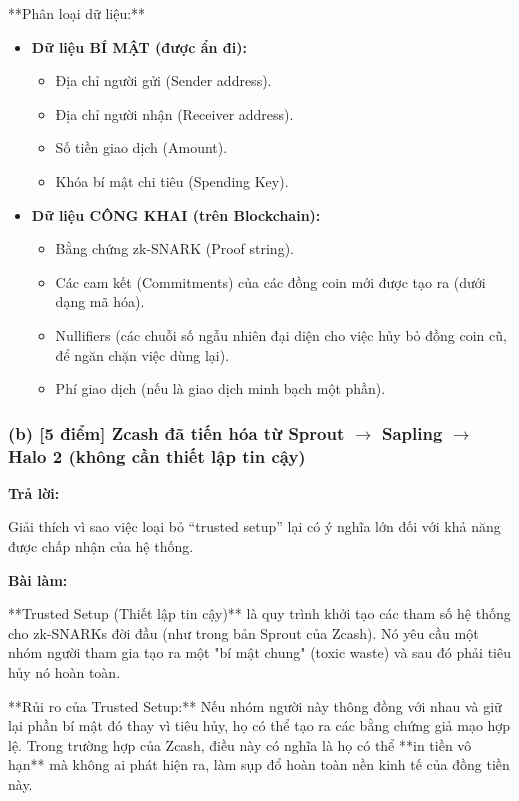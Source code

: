 **Phân loại dữ liệu:**
\begin{itemize}
    \item \textbf{Dữ liệu BÍ MẬT (được ẩn đi):}
        \begin{itemize}
            \item Địa chỉ người gửi (Sender address).
            \item Địa chỉ người nhận (Receiver address).
            \item Số tiền giao dịch (Amount).
            \item Khóa bí mật chi tiêu (Spending Key).
        \end{itemize}
    \item \textbf{Dữ liệu CÔNG KHAI (trên Blockchain):}
        \begin{itemize}
            \item Bằng chứng zk-SNARK (Proof string).
            \item Các cam kết (Commitments) của các đồng coin mới được tạo ra (dưới dạng mã hóa).
            \item Nullifiers (các chuỗi số ngẫu nhiên đại diện cho việc hủy bỏ đồng coin cũ, để ngăn chặn việc dùng lại).
            \item Phí giao dịch (nếu là giao dịch minh bạch một phần).
        \end{itemize}
\end{itemize}

\subsubsection{(b) [5 điểm] Zcash đã tiến hóa từ Sprout \texorpdfstring{$\rightarrow$}{->} Sapling \texorpdfstring{$\rightarrow$}{->} Halo 2 (không cần thiết lập tin cậy)}

\begin{center}
    \textbf{Trả lời:}
\end{center}

Giải thích vì sao việc loại bỏ ``trusted setup'' lại có ý nghĩa lớn đối với khả năng được chấp nhận của hệ thống.

\textbf{Bài làm:}

**Trusted Setup (Thiết lập tin cậy)** là quy trình khởi tạo các tham số hệ thống cho zk-SNARKs đời đầu (như trong bản Sprout của Zcash). Nó yêu cầu một nhóm người tham gia tạo ra một "bí mật chung" (toxic waste) và sau đó phải tiêu hủy nó hoàn toàn.

**Rủi ro của Trusted Setup:**
Nếu nhóm người này thông đồng với nhau và giữ lại phần bí mật đó thay vì tiêu hủy, họ có thể tạo ra các bằng chứng giả mạo hợp lệ. Trong trường hợp của Zcash, điều này có nghĩa là họ có thể **in tiền vô hạn** mà không ai phát hiện ra, làm sụp đổ hoàn toàn nền kinh tế của đồng tiền này.

